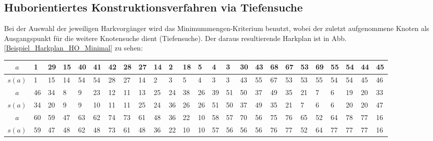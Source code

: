 \subsection{Huborientiertes Konstruktionsverfahren via Tiefensuche}
\label{Beispiel Huborientiertes Verfahren TS}

Bei der Auswahl der jeweiligen Harkvorgänger wird das Minimummengen-Kriterium benutzt, wobei 
der zuletzt aufgenommene Knoten als Ausgangspunkt für die weitere Knotensuche dient (Tiefensuche). Der daraus resultierende Harkplan ist in Abb. \ref{Beispiel_Harkplan_HO_Minimal} zu sehen:

\begin{center}
\begin{minipage}{\textwidth}
\renewcommand{\arraystretch}{1.1}
\begin{scriptsize}
\begin{tabular}{|c|*{24}{|p{.15cm}}|}
\hline
$a$&1&29&15&40&41&42&28&27&14&2&18&5&4&3&30&43&68&67&53&69&55&54&44&45 \\
\hline
$s(a)$&1&15&14&54&54&28&27&14&2&3&5&4&3&3&43&55&67&53&53&55&54&54&45&46\\
\hline \hline
$a$&46&34&8&9&23&12&11&13&25&24&38&26&39&51&50&37&49&35&21&7&6&19&20&33\\
\hline
$s(a)$&34&20&9&9&10&11&11&25&24&36&26&26&51&50&37&49&35&21&7&6&6&20&20&47\\
\hline \hline
$a$&60&59&47&63&62&74&73&61&48&36&22&10&58&57&70&56&75&76&65&52&64&78&77&16\\
\hline
$s(a)$&59&47&48&62&48&73&61&48&36&22&10&10&57&56&56&56&76&77&52&64&77&77&77&16\\
\hline
\end{tabular}
\label{Beispiel_HO_Minimalmengen}
\end{scriptsize} 
\renewcommand{\arraystretch}{1}


\end{minipage}
\end{center}
